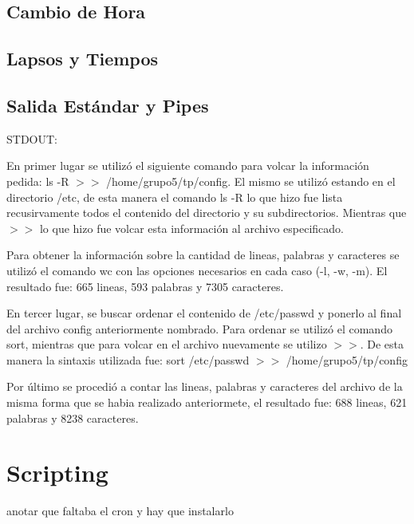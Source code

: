 \documentclass[a4paper, 12pt]{article}
\begin{document}
\subsection*{Cambio de Hora}

\subsection*{Lapsos y Tiempos}

\subsection*{Salida Est\'andar y Pipes}

STDOUT:

En primer lugar se utiliz\'o el siguiente comando para volcar la informaci\'on pedida: ls -R $>>$ /home/grupo5/tp/config. El mismo se utiliz\'o estando en el directorio /etc, de esta manera el comando ls -R lo que hizo fue lista recusirvamente todos el contenido del directorio y su subdirectorios. Mientras que $>>$ lo que hizo fue volcar esta informaci\'on al archivo especificado.

Para obtener la informaci\'on sobre la cantidad de lineas, palabras y caracteres se utiliz\'o el comando wc con las opciones necesarios en cada caso (-l, -w, -m). El resultado fue: 665 lineas, 593 palabras y 7305 caracteres.

En tercer lugar, se buscar ordenar el contenido de /etc/passwd y ponerlo al final del archivo config anteriormente nombrado. Para ordenar se utiliz\'o el comando sort, mientras que para volcar en el archivo nuevamente se utilizo $>>$. De esta manera la sintaxis utilizada fue: sort /etc/passwd $>>$ /home/grupo5/tp/config

Por \'ultimo se procedi\'o a contar las lineas, palabras y caracteres del archivo de la misma forma que se habia realizado anteriormete, el resultado fue: 688 lineas, 621 palabras y 8238 caracteres.




\section*{Scripting}

anotar que faltaba el cron y hay que instalarlo
\end{document}
